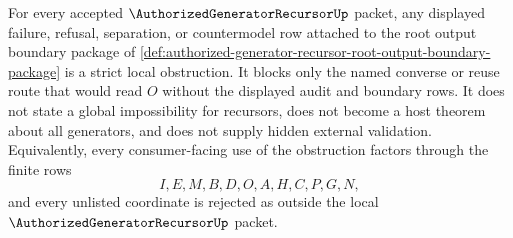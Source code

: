\begin{corollary}
\label{cor:authorized-generator-recursor-root-output-boundary-strict-obstruction}
For every accepted $\AuthorizedGeneratorRecursorUp$ packet, any displayed failure, refusal, separation, or countermodel row attached to the root output boundary package of \autoref{def:authorized-generator-recursor-root-output-boundary-package} is a strict local obstruction. It blocks only the named converse or reuse route that would read $O$ without the displayed audit and boundary rows. It does not state a global impossibility for recursors, does not become a host theorem about all generators, and does not supply hidden external validation. Equivalently, every consumer-facing use of the obstruction factors through the finite rows
$$
I,E,M,B,D,O,A,H,C,P,G,N,
$$
and every unlisted coordinate is rejected as outside the local $\AuthorizedGeneratorRecursorUp$ packet.
\end{corollary}
